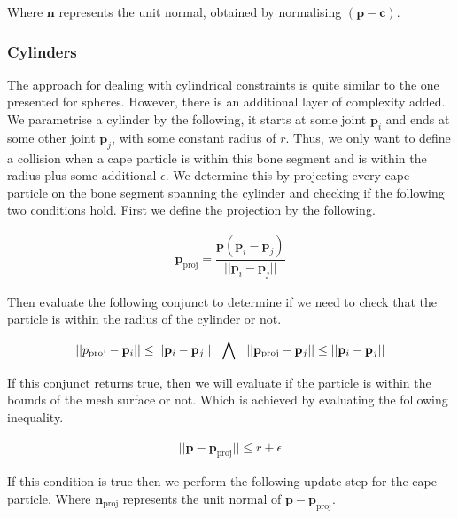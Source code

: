 \documentclass{article}
\begin{document}
Where $\mathbf{n}$ represents the unit normal, obtained by normalising $(\mathbf{p} - \mathbf{c})$.

\subsubsection{Cylinders}

The approach for dealing with cylindrical constraints is quite similar to the one presented for spheres. 
However, there is an additional layer of complexity added. We parametrise a cylinder by the following, it
starts at some joint $\mathbf{p}_i$ and ends at some other joint $\mathbf{p}_j$, with some constant radius
of $r$. Thus, we only want to define a collision when a cape particle is within this bone segment and is
within the radius plus some additional $\epsilon$. We determine this by projecting every cape particle on
the bone segment spanning the cylinder and checking if the following two conditions hold. First we define
the projection by the following.

\begin{align}
  \mathbf{p}_{\text{proj}} = \dfrac{\mathbf{p} (\mathbf{p}_i - \mathbf{p}_j)}{||\mathbf{p}_i - \mathbf{p}_j||}
\end{align}

Then evaluate the following conjunct to determine if we need to check that the particle is within the radius
of the cylinder or not.

\begin{align}
  || p_{\text{proj}} - \mathbf{p}_i || \leq ||\mathbf{p}_i - \mathbf{p}_j||  \hspace{2.5mm}  \bigwedge \hspace{2.5mm} || \mathbf{p}_{\text{proj}} - \mathbf{p}_j ||  \leq ||\mathbf{p}_i - \mathbf{p}_j|| 
\end{align}

If this conjunct returns true, then we will evaluate if the particle is within the bounds of the mesh surface or
not. Which is achieved by evaluating the following inequality.

\begin{align}
  || \mathbf{p} - \mathbf{p}_{\text{proj}} || \leq r + \epsilon
\end{align}

If this condition is true then we perform the following update step for the cape particle. Where $\mathbf{n}_{\text{proj}}$
represents the unit normal of $\mathbf{p} - \mathbf{p}_{\text{proj}}$.
\end{document}
